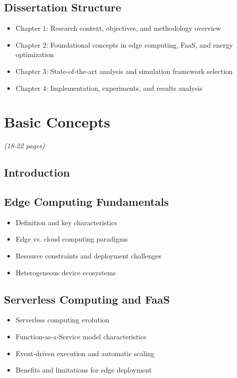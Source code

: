 \documentclass[12pt,a4paper]{report}
\begin{document}
\section{Dissertation Structure}
\begin{itemize}[leftmargin=1cm]
    \item Chapter 1: Research context, objectives, and methodology overview
    \item Chapter 2: Foundational concepts in edge computing, FaaS, and energy optimization
    \item Chapter 3: State-of-the-art analysis and simulation framework selection
    \item Chapter 4: Implementation, experiments, and results analysis
\end{itemize}


\chapter{Basic Concepts}
\textit{(18-22 pages)}

\section{Introduction}

\section{Edge Computing Fundamentals}
\begin{itemize}[leftmargin=1cm]
    \item Definition and key characteristics
    \item Edge vs. cloud computing paradigms
    \item Resource constraints and deployment challenges
    \item Heterogeneous device ecosystems
\end{itemize}

\section{Serverless Computing and FaaS}
\begin{itemize}[leftmargin=1cm]
    \item Serverless computing evolution
    \item Function-as-a-Service model characteristics
    \item Event-driven execution and automatic scaling
    \item Benefits and limitations for edge deployment
\end{itemize}
\end{document}
